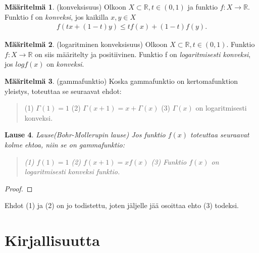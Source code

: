 \documentclass[12pt]{article}
\theoremstyle{definition}
\newtheorem{maar}{Määritelmä}
\theoremstyle{plain}
\newtheorem{lause}[maar]{Lause}
\begin{document}
\begin{maar}
(konveksisuus)
Olkoon $X \subset \mathbb{R}, t \in (0, 1)$ ja funktio $f: X \rightarrow \mathbb{R}$. Funktio f on \emph{konveksi}, jos kaikilla $x,y \in X$
\begin{align*}
    f(tx+(1-t)y) \le tf(x)+(1-t)f(y).
\end{align*}
\end{maar}


\begin{maar}
(logaritminen konveksisuus)
Olkoon $X \subset \mathbb{R}, t \in (0, 1)$. Funktio $f: X \rightarrow \mathbb{R}$ on siis määritelty ja positiivinen. Funktio f on \emph{logaritmisesti konveksi}, jos $logf(x)$ on \emph{konveksi}.
\end{maar}


\begin{maar}
(gammafunktio)
Koska gammafunktio on kertomafunktion yleistys, toteuttaa se seuraavat ehdot:
\begin{quote}
    (1) $\Gamma(1)=1$ \newline
    (2) $\Gamma(x+1)=x+\Gamma(x)$ \newline
    (3) $\Gamma(x)$ on logaritmisesti konveksi.
\end{quote}
\end{maar}

\begin{lause}
Lause(Bohr-Mollerupin lause)
\newline
Jos funktio $f(x)$ toteuttaa seuraavat kolme ehtoa, niin se on gammafunktio:
\begin{quote}
(1) $f(1)=1$ \newline
(2) $f(x+1)=xf(x)$ \newline
(3) Funktio $f(x)$ on logaritmisesti konveksi funktio.
\end{quote}
\end{lause}

\begin{proof}

\end{proof}
\newline
Ehdot (1) ja (2) on jo todistettu, joten jäljelle jää osoittaa ehto (3) todeksi. 

\newpage
\section{Kirjallisuutta}
\onehalfspacing
[1] 
\newline
[2]
\newline
[3]
\newline
[4]
\end{document}
